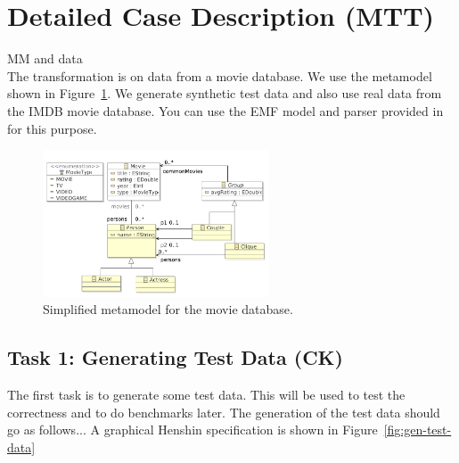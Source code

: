\documentclass[a4paper,11pt]{article}
\begin{document}
\section{Detailed Case Description (MTT)}\label{sec-case}

MM and data\\

The transformation is on data from a movie database.
We use the metamodel shown in Figure~\ref{fig:metamodel}.
We generate synthetic test data and also use real data
from the IMDB movie database. You can use the EMF model and
parser provided in \cite{IMDB2EMF} for this purpose.


\begin{figure}[ht]
\centering
\includegraphics[width=0.6\textwidth]{movies}
\caption{Simplified metamodel for the movie database.}
\label{fig:metamodel}
\end{figure}

\subsection{Task 1: Generating Test Data (CK)}
\label{sec:gen-test-data}

The first task is to generate some test data.
This will be used to test the correctness and to do benchmarks later.
The generation of the test data should go as follows...
A graphical Henshin specification is shown in Figure~\ref{fig:gen-test-data}
\end{document}
